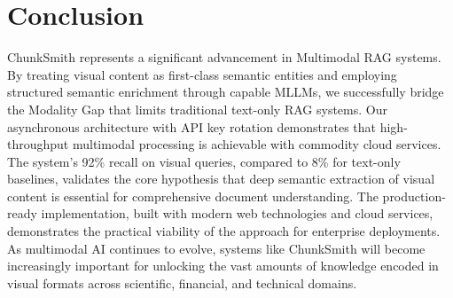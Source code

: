 \documentclass[conference]{IEEEtran}
\begin{document}
\section{Conclusion}
ChunkSmith represents a significant advancement in Multimodal RAG systems. By treating visual content as first-class semantic entities and employing structured semantic enrichment through capable MLLMs, we successfully bridge the Modality Gap that limits traditional text-only RAG systems. Our asynchronous architecture with API key rotation demonstrates that high-throughput multimodal processing is achievable with commodity cloud services. The system's 92\% recall on visual queries, compared to 8\% for text-only baselines, validates the core hypothesis that deep semantic extraction of visual content is essential for comprehensive document understanding. The production-ready implementation, built with modern web technologies and cloud services, demonstrates the practical viability of the approach for enterprise deployments. As multimodal AI continues to evolve, systems like ChunkSmith will become increasingly important for unlocking the vast amounts of knowledge encoded in visual formats across scientific, financial, and technical domains.
\end{document}
